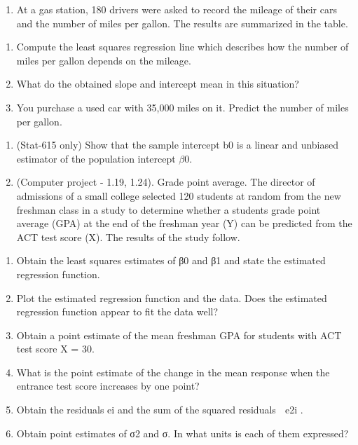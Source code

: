 \documentclass[
]{article}
\providecommand{\tightlist}{%
  \setlength{\itemsep}{0pt}\setlength{\parskip}{0pt}}
\begin{document}
\begin{enumerate}
\def\labelenumi{\arabic{enumi}.}
\setcounter{enumi}{4}
\tightlist
\item
  At a gas station, 180 drivers were asked to record the mileage of
  their cars and the number of miles per gallon. The results are
  summarized in the table.\\
\end{enumerate}

\begin{enumerate}
\def\labelenumi{(\alph{enumi})}
\tightlist
\item
  Compute the least squares regression line which describes how the
  number of miles per gallon depends on the mileage.\\
\item
  What do the obtained slope and intercept mean in this situation?\\
\item
  You purchase a used car with 35,000 miles on it. Predict the number of
  miles per gallon.\\
\end{enumerate}

\begin{enumerate}
\def\labelenumi{\arabic{enumi}.}
\setcounter{enumi}{5}
\item
  (Stat-615 only) Show that the sample intercept b0 is a linear and
  unbiased estimator of the population intercept \(\beta0\).
\item
  (Computer project - 1.19, 1.24). Grade point average. The director of
  admissions of a small college selected 120 students at random from the
  new freshman class in a study to determine whether a students grade
  point average (GPA) at the end of the freshman year (Y) can be
  predicted from the ACT test score (X). The results of the study
  follow.\\
\end{enumerate}

\begin{enumerate}
\def\labelenumi{(\alph{enumi})}
\tightlist
\item
  Obtain the least squares estimates of β0 and β1 and state the
  estimated regression function.\\
\item
  Plot the estimated regression function and the data. Does the
  estimated regression function appear to fit the data well?\\
\item
  Obtain a point estimate of the mean freshman GPA for students with ACT
  test score X = 30.\\
\item
  What is the point estimate of the change in the mean response when the
  entrance test score increases by one point?\\
\item
  Obtain the residuals ei and the sum of the squared residuals 􏰀 e2i .\\
\item
  Obtain point estimates of σ2 and σ. In what units is each of them
  expressed?\\
\end{enumerate}
\end{document}
